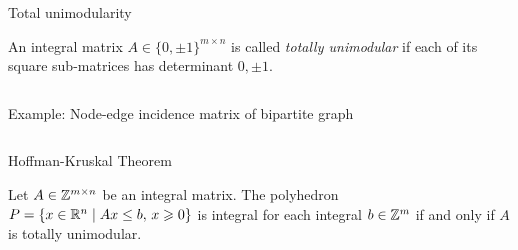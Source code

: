 \begin{frame}{Total unimodularity}


\begin{definition}
  \label{def:skip1}  
  An integral matrix $A \in \{0 , \pm 1\}^{m\times n}$ is
  called \emph{totally
  unimodular} if each of its square sub-matrices has
  determinant
  $0,\pm1$.
\end{definition}
   

   \begin{columns}
    \begin{column}{.5\textwidth}
      
    \end{column}
    \begin{column}{.5\textwidth}
      
    \end{column}       
  \end{columns}
\end{frame}





\begin{frame}{Example: Node-edge incidence matrix of bipartite graph}


   \begin{columns}
    \begin{column}{.5\textwidth}
      
    \end{column}
    \begin{column}{.5\textwidth}
      
    \end{column}       
  \end{columns}
\end{frame}





\begin{frame}{Hoffman-Kruskal Theorem}
\begin{theorem}
  \label{po:thr:16}
  Let $A\in \mathbb{Z}^{m\times n}$ be an integral matrix. The polyhedron $P = \{ x
  \in \mathbb{R}^n \mid Ax\leq b, \, x\geqslant0\}$ is integral for each integral $b \in
  \mathbb{Z}^m$ if and only if $A$ is totally unimodular. 
\end{theorem}


   \begin{columns}
    \begin{column}{.5\textwidth}
      
    \end{column}
    \begin{column}{.5\textwidth}
      
    \end{column}       
  \end{columns}
\end{frame}




